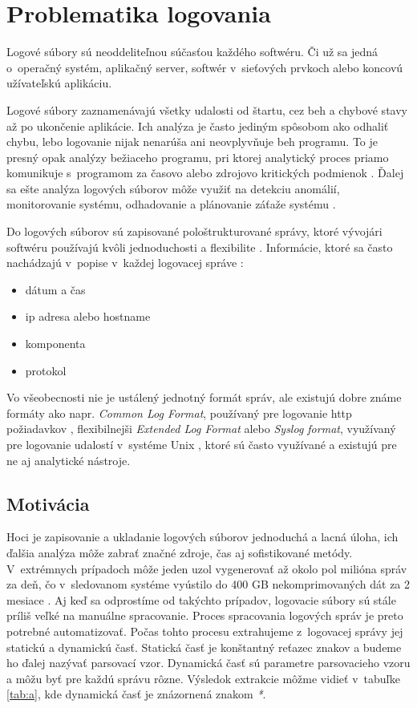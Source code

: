 \chapter{Problematika logovania}

Logové súbory sú neoddeliteľnou súčasťou každého softwéru. Či už sa jedná o~operačný systém, aplikačný server, softwér v~sieťových prvkoch alebo koncovú užívateľskú aplikáciu. 
\par Logové súbory zaznamenávajú všetky udalosti od štartu, cez beh a chybové stavy až po ukončenie aplikácie. Ich analýza je často jediným spôsobom ako odhaliť chybu, lebo logovanie nijak nenarúša ani neovplyvňuje beh programu. To je presný opak analýzy bežiaceho programu, pri ktorej analytický proces priamo komunikuje s~programom za časovo alebo zdrojovo kritických podmienok  \parencite{jvaldman} . Ďalej sa ešte analýza logových súborov môže využiť na detekciu anomálií, monitorovanie systému, odhadovanie a plánovanie záťaže systému \parencite{logengineering}.
\par Do logových súborov sú zapisované pološtrukturované správy, ktoré vývojári softwéru používajú kvôli jednoduchosti a flexibilite \parencite{he2016, ibm}. Informácie, ktoré sa často nachádzajú v~popise v~každej logovacej správe \parencite{weblog, datapreprocessing, sshd}:
\begin{itemize}
  \item dátum a čas
  \item ip adresa alebo hostname
  \item komponenta
  \item protokol
\end{itemize}
\par Vo všeobecnosti nie je ustálený jednotný formát správ, ale existujú dobre známe formáty ako napr. \emph{Common Log Format}, používaný pre logovanie http požiadavkov \parencite{CLF} , flexibilnejši \emph{Extended Log Format} \parencite{ELF} alebo \emph{Syslog format}, využívaný pre logovanie udalostí v~systéme Unix \parencite{syslog}, ktoré sú často využívané a existujú pre ne aj analytické nástroje. \

\section{Motivácia}

\par Hoci je zapisovanie a ukladanie logových súborov jednoduchá a lacná úloha, ich ďalšia analýza môže zabrať značné zdroje, čas aj sofistikované metódy. V~extrémnych prípadoch môže jeden uzol vygenerovať až okolo pol milióna správ za deň, čo v~sledovanom systéme vyústilo do 400 GB nekomprimovaných dát za 2 mesiace \parencite{google}. Aj keď sa odprostíme od takýchto prípadov, logovacie súbory sú stále príliš veľké na manuálne spracovanie.  Proces spracovania logových správ je preto potrebné  automatizovať. Počas tohto procesu extrahujeme z~logovacej správy jej statickú a dynamickú časť. Statická časť je konštantný reťazec znakov a budeme ho ďalej nazývať parsovací vzor. Dynamická časť sú parametre parsovacieho vzoru a môžu byť pre každú správu rôzne. Výsledok extrakcie môžme vidieť v~tabuľke \ref{tab:a}, kde dynamická časť je znázornená znakom \emph{*}. 

